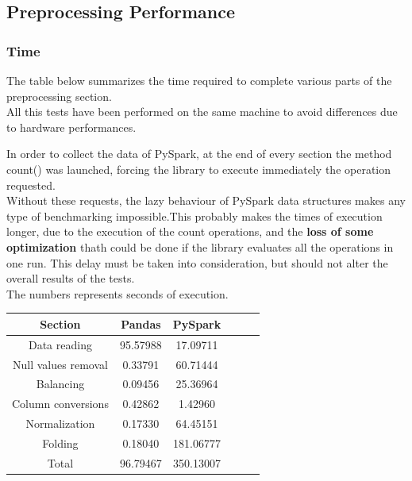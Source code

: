 \documentclass[
	letterpaper, %
	10pt, %
]{class}
\begin{document}
\subsection{Preprocessing Performance}
\subsubsection{Time}
The table below summarizes the time required to complete various parts of the preprocessing section.\\
All this tests have been performed on the same machine to avoid differences due to hardware performances.

In order to collect the data of PySpark, at the end of every section the method count() was launched, forcing the library to execute immediately the operation requested.\\

Without these requests, the lazy behaviour of PySpark data structures makes any type of benchmarking impossible.This probably makes the times of execution longer, due to
the execution of the count operations, and the \textbf{loss of some optimization} thath could be done if the library evaluates all the operations in one run.
This delay must be taken into consideration, but should not alter the overall results of the tests.\\

The numbers represents seconds of execution.

\begin{center}
    \begin{tabular}{ |c|c|c|c|c|c| }
        \hline
        Section             & Pandas   & PySpark   \\
        \hline
        Data reading        & 95.57988 & 17.09711  \\
        Null values removal & 0.33791  & 60.71444  \\
        Balancing           & 0.09456  & 25.36964  \\
        Column conversions  & 0.42862  & 1.42960   \\
        Normalization       & 0.17330  & 64.45151  \\
        Folding             & 0.18040  & 181.06777 \\
        Total               & 96.79467 & 350.13007 \\
        \hline
    \end{tabular}
\end{center}
\end{document}

